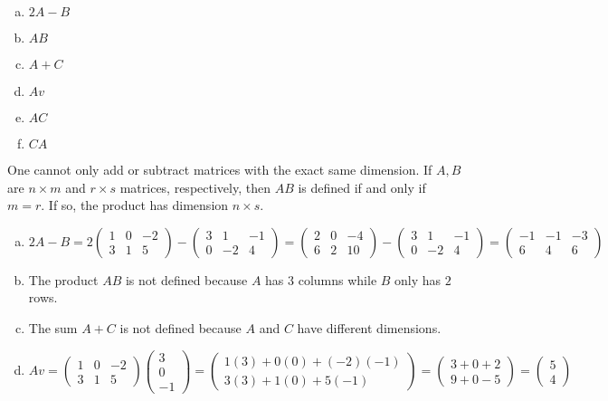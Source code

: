 \documentclass[11pt,letterpaper]{article}
\begin{document}
\begin{enumerate}[(a)]
\item $2A - B$
\item $AB$
\item $A + C$
\item $Av$
\item $AC$
\item $CA$
\end{enumerate} 

\sol One cannot only add or subtract matrices with the exact same dimension. If $A, B$ are $n \times m$ and $r \times s$ matrices, respectively, then $AB$ is defined if and only if $m= r$. If so, the product has dimension $n \times s$. 

\begin{enumerate}[(a)]
\item 
	\[
	2A - B= 2 \begin{pmatrix} 1 & 0 & -2 \\ 3 & 1 & 5 \end{pmatrix} - \begin{pmatrix} 3 & 1 & -1 \\ 0 & -2 & 4 \end{pmatrix}= \begin{pmatrix} 2 & 0 & -4 \\ 6 & 2 & 10 \end{pmatrix} - \begin{pmatrix} 3 & 1 & -1 \\ 0 & -2 & 4 \end{pmatrix}= \begin{pmatrix} -1 & -1 & -3 \\ 6 & 4 & 6 \end{pmatrix}
	\] \pspace
	
\item The product $AB$ is not defined because $A$ has $3$ columns while $B$ only has $2$ rows. \pspace

\item The sum $A + C$ is not defined because $A$ and $C$ have different dimensions. \pspace

\item 
	\[
	Av= \begin{pmatrix} 1 & 0 & -2 \\ 3 & 1 & 5 \end{pmatrix} \begin{pmatrix} 3 \\ 0 \\ -1 \end{pmatrix}= \begin{pmatrix} 1(3) + 0(0) + (-2)(-1) \\ 3(3) + 1(0) + 5(-1) \end{pmatrix}= \begin{pmatrix} 3 + 0 + 2 \\ 9 + 0 - 5 \end{pmatrix}= \begin{pmatrix} 5 \\ 4 \end{pmatrix}
	\] \pspace


\end{enumerate}
\end{document}
